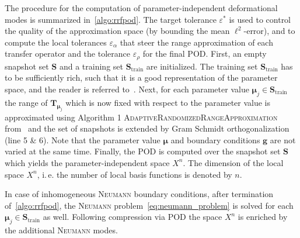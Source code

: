 \documentclass[a4paper]{eccomas_paper-2024}
\makeatletter
\newcommand{\ie}{i.\,e.\@\xspace}
\newcommand{\m}{\bm\mu}
\makeatother
\begin{document}
The procedure for the computation of parameter-independent deformational modes is summarized in~\cref{algo:rrfpod}.
The target tolerance $\varepsilon^{\ast}$ is used to control the quality of the approximation space (by bounding the mean $\ell^2$-error), and to compute the local tolerances $\varepsilon_{\alpha}$ that steer the range approximation of each transfer operator and the tolerance $\varepsilon_{\rho}$ for the final POD.
First, an empty snapshot set $\bm{S}$ and a training set $\bm{S}_{\mathrm{train}}$ are initialized.
The training set $\bm{S}_{\mathrm{train}}$ has to be sufficiently rich, such that it is a good representation of the parameter space, and the reader is referred to~\cite{Haasdonk2017Chapter}.
Next, for each parameter value $\m_j\in\bm{S}_{\mathrm{train}}$ the range of $\bm{T}_{\m_j}$ which is now fixed with respect to the parameter value is approximated using Algorithm 1 \textsc{AdaptiveRandomizedRangeApproximation} from~\cite{Buhr2018Randomized} and the set of snapshots is extended by Gram Schmidt orthogonalization (line 5 \& 6).
Note that the parameter value $\m$ and boundary conditions $\bm{g}$ are not varied at the same time.
Finally, the POD is computed over the snapshot set $\bm{S}$ which yields the parameter-independent space $X^n$.
The dimension of the local space $X^n$, \ie{} the number of local basis functions is denoted by $n$.

In case of inhomogeneous \textsc{Neumann} boundary conditions, after termination of~\cref{algo:rrfpod}, the \textsc{Neumann} problem~\cref{eq:neumann_problem} is solved for each $\m_j\in\bm{S}_{\mathrm{train}}$ as well.
Following compression via POD the space $X^n$ is enriched by the additional \textsc{Neumann} modes.
\end{document}
